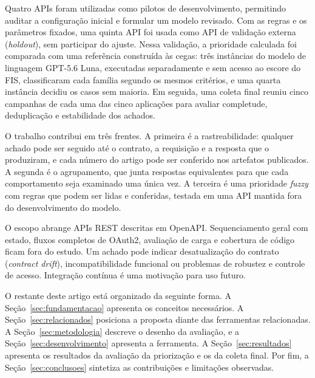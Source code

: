 Quatro APIs foram utilizadas como pilotos de desenvolvimento, permitindo
auditar a configuração inicial e formular um modelo revisado. Com as regras e
os parâmetros fixados, uma quinta API foi usada como API de validação externa
(\textit{holdout}), sem participar do ajuste. Nessa validação, a prioridade
calculada foi comparada com uma referência construída às cegas: três
instâncias do modelo de linguagem GPT-5.6 Luna, executadas separadamente e sem
acesso ao escore do FIS, classificaram cada família segundo os mesmos
critérios, e uma quarta instância decidiu os casos sem maioria. Em seguida,
uma coleta final reuniu cinco campanhas de cada uma das cinco aplicações para
avaliar completude, deduplicação e estabilidade dos achados.

O trabalho contribui em três frentes. A primeira é a rastreabilidade:
qualquer achado pode ser seguido até o contrato, a requisição e a resposta que
o produziram, e cada número do artigo pode ser conferido nos artefatos
publicados. A segunda é o agrupamento, que junta respostas equivalentes para
que cada comportamento seja examinado uma única vez. A terceira é uma
prioridade \textit{fuzzy} com regras que podem ser lidas e conferidas, testada
em uma API mantida fora do desenvolvimento do modelo.

O escopo abrange APIs REST descritas em OpenAPI. Sequenciamento geral com
estado, fluxos completos de OAuth2, avaliação de carga e cobertura de código
ficam fora do estudo. Um achado pode indicar desatualização do contrato
(\textit{contract drift}), incompatibilidade funcional ou problemas de
robustez e controle de acesso. Integração contínua é uma motivação para uso
futuro.

O restante deste artigo está organizado da seguinte forma. A
Seção~\ref{sec:fundamentacao} apresenta os conceitos necessários. A
Seção~\ref{sec:relacionados} posiciona a proposta diante das ferramentas
relacionadas. A Seção~\ref{sec:metodologia} descreve o desenho da avaliação, e a
Seção~\ref{sec:desenvolvimento} apresenta a ferramenta. A
Seção~\ref{sec:resultados} apresenta os resultados da avaliação da priorização e os da coleta
final. Por fim, a Seção~\ref{sec:conclusoes} sintetiza as contribuições e
limitações observadas.
